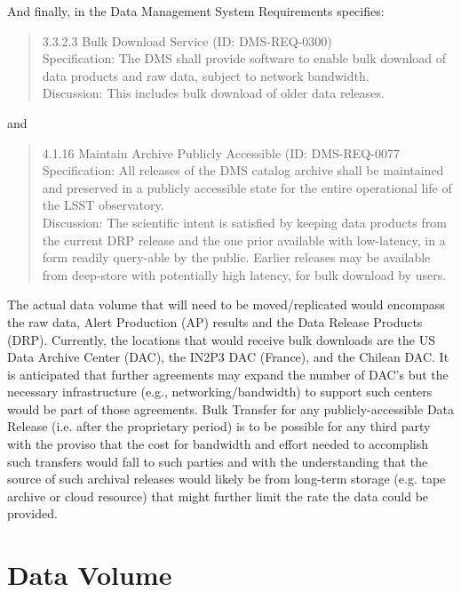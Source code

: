 And finally, in the Data Management System Requirements  specifies:
\begin{quote}
3.3.2.3 Bulk Download Service (ID: DMS-REQ-0300)\\
Specification: The DMS shall provide software to enable bulk download of data products 
and raw data, subject to network bandwidth.\\
Discussion: This includes bulk download of older data releases.
\end{quote}

and 

\begin{quote}
4.1.16 Maintain Archive Publicly Accessible (ID: DMS-REQ-0077 \\
Specification: All releases of the DMS catalog archive shall be maintained and preserved 
in a publicly accessible state for the entire operational life of the LSST observatory.\\
Discussion: The scientific intent is satisfied by keeping data products from the current 
DRP release and the one prior available with low-latency, in a form readily query-able by 
the public. Earlier releases may be available from deep-store with potentially high latency, 
for bulk download by users.
\end{quote}

The actual data volume that will need to be moved/replicated would encompass the raw data,
Alert Production (AP) results and the Data Release Products (DRP).  Currently, the locations that
would receive bulk downloads are the US Data Archive Center (DAC), the IN2P3 DAC (France), and 
the Chilean DAC.  It is anticipated that further agreements may expand the number of DAC's but 
the necessary infrastructure (e.g., networking/bandwidth) to support such centers would be part 
of those agreements.  Bulk Transfer for any publicly-accessible Data Release (i.e. after the 
proprietary period) is to be possible 
for any third party with the proviso that the cost for bandwidth and effort needed to accomplish 
such transfers would fall to such parties and with the understanding that the source of such
archival releases would likely be from long-term storage (e.g. tape archive or cloud resource) that might
further limit the rate the data could be provided.


\section{Data Volume\label{sec_scale}}

